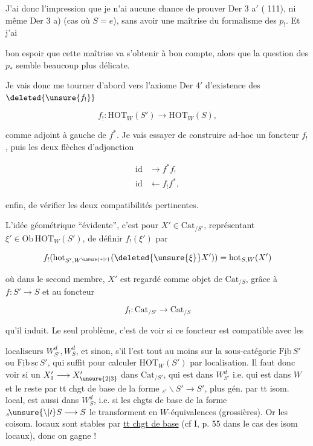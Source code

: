J'ai donc l'impression que je n'ai aucune chance de prouver Der 3 a$'$ ( 111), ni même Der 3 a) (cas où $S=e$), sans avoir une maîtrise du formalisme des $p_!$. Et j'ai

bon espoir que cette maîtrise va s'obtenir à bon compte, alors que la question des $p_*$ semble beaucoup plus délicate.

Je vais donc me tourner d'abord vers l'axiome Der 4$'$ d'existence des $\deleted{\unsure{f_!}}$

\[
f_!:\mathrm{HOT}_W(S')\longrightarrow\mathrm{HOT}_W(S),
\]

comme adjoint à gauche de $f^*$. Je vais essayer de construire ad-hoc un foncteur $f_!$, puis  les deux flèches d'adjonction

\[
\begin{aligned}
\mathrm{id}&\longrightarrow f^* f_!\\
\mathrm{id}&\longleftarrow f_! f^*,
\end{aligned}
\]

 enfin, de vérifier les deux compatibilités pertinentes.

L'idée géométrique ``évidente'', c'est pour $X'\in\mathrm{Cat}_{/S'}$, représentant $\xi'\in\mathrm{Ob}\,\mathrm{HOT}_W(S')$, de définir $f_!(\xi')$ par

\[
f_!(\mathrm{hot}_{S',W^{\unsure{*|\prime}}}(\deleted{\unsure{\xi}}X'))=\mathrm{hot}_{S,W}(X')
\]

où dans le second membre, $X'$ est regardé comme objet de $\mathrm{Cat}_{/S}$, grâce à $f:S'\longrightarrow S$ et au foncteur

\[
f_!:\mathrm{Cat}_{/S'}\longrightarrow\mathrm{Cat}_{/S}
\]

qu'il induit. Le seul problème, c'est de voir si ce foncteur est compatible avec les

localiseurs $W^d_{S'},W^d_S$, et sinon, s'il l'est tout au moins sur la sous-catégorie $\underline{\mathrm{Fib}}\,S'$ ou $\underline{\mathrm{Fib}}\,\underline{\mathrm{sc}}\,S'$, qui suffit pour calculer $\mathrm{HOT}_W(S')$ par localisation. Il faut donc voir si un $X'_1\longrightarrow X'_{\unsure{2|3}}$ dans $\mathrm{Cat}_{/S'}$, qui est dans $W_{S'}^d$ i.e. qui est dans $W$ et le reste par tt chgt de base  de la forme $ {}_{s'}\!\backslash S'\longrightarrow S'$, plus gén. par tt isom. local, est aussi dans $W_S^d$, i.e. si les chgts de base de la forme $ {}_{s}\!\unsure{\backslash|\prime} S\longrightarrow S$ le transforment en $W$-équivalences (grossières). Or les  coisom. locaux sont stables par \uline{tt chgt de base} (cf I, p. 55 dans le cas  des isom locaux), donc on gagne !

